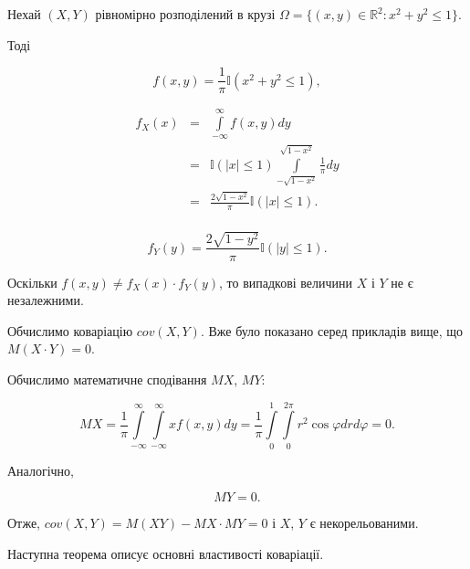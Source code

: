 \begin{example}
    Нехай $(X, Y)$ рівномірно розподілений в крузі
    $\Omega = \{(x, y) \in \mathbb{R}^2: x^2 + y^2 \leqslant 1\}$.
    
    Тоді
    
    $$f(x, y) = \frac{1}{\pi} \mathbb{I}(x^2 + y^2 \leqslant 1),$$
    
    $$\begin{array}{rcl}
        f_X(x) & = & \int\limits_{-\infty}^{\infty} f(x, y) dy \\
        & = & \mathbb{I}(|x| \leqslant 1) \int\limits_{-\sqrt{1 - x^2}}^{\sqrt{1 - x^2}} \frac{1}{\pi} dy \\
        & = & \frac{2 \sqrt{1 - x^2}}{\pi} \mathbb{I}(|x| \leqslant 1). \\
    \end{array}$$
    
    $$f_Y(y) = \frac{2 \sqrt{1 - y^2}}{\pi} \mathbb{I}(|y| \leqslant 1).$$
    
    Оскільки $f(x, y) \neq f_X(x) \cdot f_Y(y)$, то
    випадкові величини $X$ і $Y$ не є незалежними.
    
    Обчислимо коваріацію $cov(X, Y)$.
    Вже було показано серед прикладів вище, що
    $M(X \cdot Y) = 0$.
    
    Обчислимо математичне сподівання $MX$, $MY$:
    
    $$MX
    = \frac{1}{\pi} \int\limits_{-\infty}^{\infty} \int\limits_{-\infty}^{\infty} x f(x, y) dy
    = \frac{1}{\pi} \int\limits_{0}^{1} \int\limits_{0}^{2\pi} r^2 \cos\varphi dr d\varphi
    = 0.$$
    
    Аналогічно, 
    
    $$MY = 0.$$
    
    Отже, $cov(X, Y) = M(XY) - MX \cdot MY = 0$
    і $X$, $Y$ є некорельованими.
\end{example}

Наступна теорема описує основні властивості коваріації.

